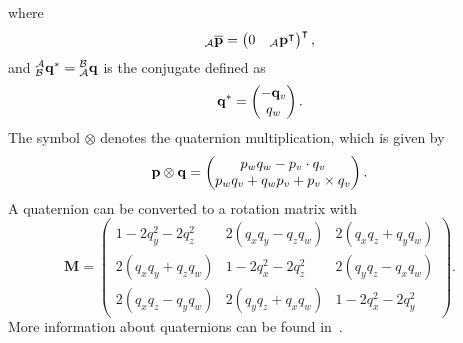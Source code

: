 where
\begin{equation}
    {}_\mathcal{A}\overline{\vb{p}} = \begin{pmatrix}
        0 & {}_\mathcal{A}\vb{p}^\intercal
    \end{pmatrix}^\intercal,
\end{equation}
and $\qtf{a}{b}^* = \qtf{b}{a}$ is the conjugate defined as
\begin{equation}
    \qtf{}{}^* = \begin{pmatrix}
        -\vb{q}_v \\
        q_w
    \end{pmatrix}.
\end{equation}
The symbol $\otimes$ denotes the quaternion multiplication, which is given by
\begin{equation}
    \vb{p} \otimes \vb{q} =
    \begin{pmatrix}
        p_{w} q_{w}-p_v \cdot q_v \\
        p_{w} q_v+q_{w} p_v+p_v \times q_v
    \end{pmatrix}.
\end{equation}
A quaternion can be converted to a rotation matrix with
\begin{equation}
    \label{eq:q_to_M}
    \mathbf{M} =
    \begin{pmatrix}
        1 - 2q_y^2-2 q_z^2   & 2(q_x q_y- q_z q_w) & 2(q_x q_z + q_y q_w) \\
        2(q_x q_y + q_z q_w) & 1-2 q_x^2-2 q_z^2   & 2(q_y q_z -q_x q_w)  \\
        2(q_x q_z-q_y q_w)   & 2(q_y q_z+ q_x q_w) & 1 - 2 q_x^2- 2 q_y^2
    \end{pmatrix}.
\end{equation}
More information about quaternions can be found in~\cite{Kok2017, Trawny2005}.

